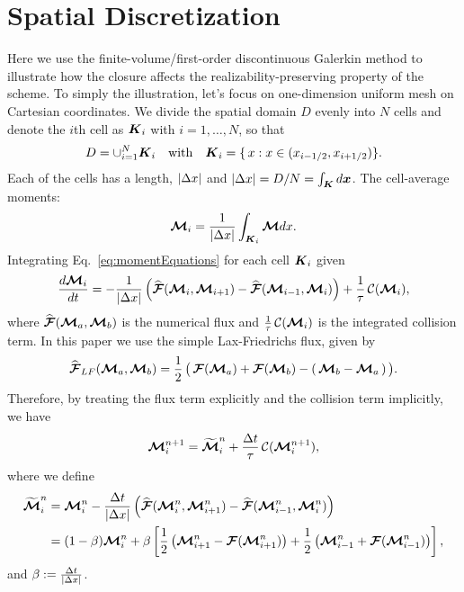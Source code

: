 \section{Spatial Discretization}\label{se:SpacialDiscretization}
Here we use the finite-volume/first-order discontinuous Galerkin method to illustrate how the closure affects the realizability-preserving property of the scheme.
To simply the illustration, let's focus on one-dimension uniform mesh on Cartesian coordinates.
We divide the spatial domain $D$ evenly into $N$ cells and denote the $i$th cell as $\boldsymbol{K}_{i}$ with $i = 1,\ldots,N$, so that
\begin{equation*}
D = \cup_{i = 1}^{N} \boldsymbol{K}_{i} \quad \text{with} \quad
  \boldsymbol{K}_{i}=\{\,x : x\in(x_{i-1/2}, x_{i+1/2})\}.
\end{equation*}
Each of the cells has a length, $|\Delta x|$ and $|\Delta x| = D/N = \int_{\boldsymbol{K}}d\boldsymbol{x}$.
The cell-average moments:
\begin{equation}
\boldsymbol{\mathcal{M}}_{i} = \dfrac{1}{|\Delta x|} \int_{\boldsymbol{K}_i}\boldsymbol{\mathcal{M}} dx.
\end{equation}
Integrating Eq.~\eqref{eq:momentEquations} for each cell $\boldsymbol{K}_{i}$ given
\begin{equation}
\dfrac{d \boldsymbol{\mathcal{M}}_{i}}{d t} = - \dfrac{1}{|\Delta x|} \left( \widehat{\boldsymbol{\mathcal{F}}}(\boldsymbol{\mathcal{M}}_{i},\boldsymbol{\mathcal{M}}_{i+1}) -  \widehat{\boldsymbol{\mathcal{F}}}(\boldsymbol{\mathcal{M}}_{i-1},\boldsymbol{\mathcal{M}}_{i})\right) + \frac{1}{\tau}\,\mathcal{C}(\boldsymbol{\mathcal{M}}_{i}),
\label{eq:SemiDiscretizatedMomentEquation}
\end{equation}
where $\widehat{\boldsymbol{\mathcal{F}}}(\boldsymbol{\mathcal{M}}_{a},\boldsymbol{\mathcal{M}}_{b})$ is the numerical flux and $\frac{1}{\tau}\,\mathcal{C}(\boldsymbol{\mathcal{M}}_{i})$ is the integrated collision term.
In this paper we use the simple Lax-Friedrichs flux, given by
\begin{equation}
  \widehat{\boldsymbol{\mathcal{F}}}_{LF}(\boldsymbol{\mathcal{M}}_{a},\boldsymbol{\mathcal{M}}_{b})
  =\frac{1}{2}\,\big(\,\boldsymbol{\mathcal{F}}(\boldsymbol{\mathcal{M}}_{a})+\boldsymbol{\mathcal{F}}(\boldsymbol{\mathcal{M}}_{b})-(\,\boldsymbol{\mathcal{M}}_{b}-\boldsymbol{\mathcal{M}}_{a}\,)\,\big).
  \label{eq:Lax-Friedrichs flux}
\end{equation}
Therefore, by treating the flux term explicitly and the collision term implicitly, we have
\begin{align}
\boldsymbol{\mathcal{M}}_{i}^{n+1} = \widetilde{\boldsymbol{\mathcal{M}}}^{n}_{i} + \frac{\Delta t}{\tau}\,\mathcal{C}(\boldsymbol{\mathcal{M}}^{n+1}_{i}),
\label{eq:MomentIMEX}
\end{align}
where we define
\begin{align}
\widetilde{\boldsymbol{\mathcal{M}}}^{n}_{i} 
& = \boldsymbol{\mathcal{M}}_{i}^{n} - \dfrac{\Delta t}{|\Delta x|} \left( \widehat{\boldsymbol{\mathcal{F}}}(\boldsymbol{\mathcal{M}}^{n}_{i},\boldsymbol{\mathcal{M}}^{n}_{i+1}) -  \widehat{\boldsymbol{\mathcal{F}}}(\boldsymbol{\mathcal{M}}^{n}_{i-1},\boldsymbol{\mathcal{M}}^{n}_{i})\right)\nonumber \\
& = (1-\beta)\boldsymbol{\mathcal{M}}_{i}^{n} + \beta\left[ \frac{1}{2}\left( \boldsymbol{\mathcal{M}}^{n}_{i+1}-\boldsymbol{\mathcal{F}}(\boldsymbol{\mathcal{M}}^{n}_{i+1})\right)  + \frac{1}{2}\left( \boldsymbol{\mathcal{M}}^{n}_{i-1}+\boldsymbol{\mathcal{F}}(\boldsymbol{\mathcal{M}}^{n}_{i-1})\right)\right],
\label{eq:widetildeM}
\end{align}
and $\beta := \frac{\Delta t}{|\Delta x|}$.

